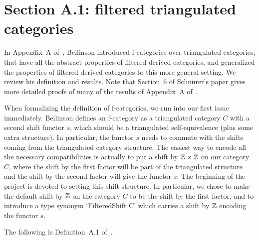 \section{Section A.1: filtered triangulated categories}

In Appendix~A of~\cite{Be1}, Beilinson introduced f-categories over triangulated categories, that have all the abstract properties of filtered
derived categories, and generalized the properties of filtered derived categories to this more general setting. We review his definition and results.
Note that Section~6 of Schn\"urer's paper \cite{Schnur} gives more detailed proofs of many of the results of Appendix~A of~\cite{Be1}.

When formalizing the definition of f-categories, we run into our first issue immediately. Beilinson defines an f-category as a triangulated
category $C$ with a second shift functor $s$, which should be a triangulated self-equivalence (plus some extra structure). In particular,
the functor $s$ needs to commute with the shifts coming from the triangulated category structure. The easiest way to encode all
the necessary compatibilities is actually to put a shift by $\mathbb{Z} \times \mathbb{Z}$ on our category $C$, where the shift by the first factor
will be part of the triangulated structure and the shift by the second factor will give the functor $s$. The beginning of the project
is devoted to setting this shift structure. In particular, we chose to make the default shift by $\mathbb{Z}$ on the  category $C$ to be the
shift by the first factor, and to introduce a type synonym `FilteredShift C' which carries a shift by $\mathbb{Z}$ encoding the functor  $s$.

The following is Definition~A.1 of~\cite{Be1}.


